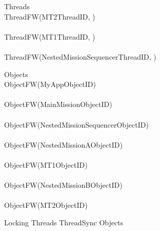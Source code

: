 %
\begin{circus}
\circprocess Threads \circdef  \\
\circblockopen
ThreadFW(MT2ThreadID, ) \\
\interleave \\
ThreadFW(MT1ThreadID, ) \\
\interleave \\
ThreadFW(NestedMissionSequencerThreadID, ) \\

\circblockclose
\end{circus}
%
%
\begin{circus}
\circprocess Objects \circdef \\
\circblockopen
ObjectFW(MyAppObjectID) \\
\interleave \\
ObjectFW(MainMissionObjectID) \\
\interleave \\
ObjectFW(NestedMissionSequencerObjectID) \\
\interleave \\
ObjectFW(NestedMissionAObjectID) \\
\interleave \\
ObjectFW(MT1ObjectID) \\
\interleave \\
ObjectFW(NestedMissionBObjectID) \\
\interleave \\
ObjectFW(MT2ObjectID) \\

\circblockclose
\end{circus}
%
%
\begin{circus}
\circprocess Locking \circdef Threads \lpar ThreadSync \rpar Objects
\end{circus}
